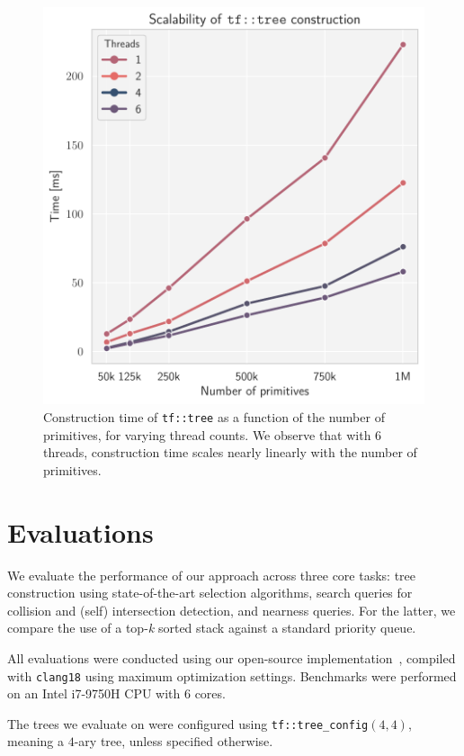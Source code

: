 \begin{figure}[!thp]
\includegraphics[width=\linewidth]{../figures/build_scaling.pdf}
\caption{%
  Construction time of \texttt{tf::tree} as a function of the number of primitives, %
  for varying thread counts. We observe that with 6 threads, %
  construction time scales nearly linearly with the number of primitives.%
}
\label{fig:scaling}
\end{figure}

\section{Evaluations}\label{sec:eval}

We evaluate the performance of our approach across three core tasks:
tree construction using state-of-the-art selection algorithms,
search queries for collision and (self) intersection detection,
and nearness queries. For the latter, we compare the use of a
top-\emph{k} sorted stack against a standard priority queue.

All evaluations were conducted using our open-source
implementation~\cite{trueform}, compiled with \texttt{clang18}
using maximum optimization settings. Benchmarks were performed
on an Intel i7-9750H CPU with 6 cores.

The trees we evaluate on were configured using
\texttt{tf::tree\_config}$(4, 4)$, meaning
a $4$-ary tree, unless specified otherwise.

